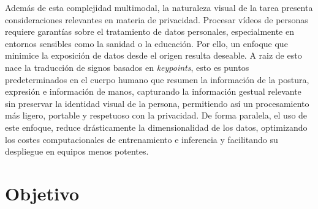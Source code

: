 Además de esta complejidad multimodal, la naturaleza visual de la tarea presenta consideraciones relevantes en materia de privacidad. Procesar vídeos de personas requiere garantías sobre el tratamiento de datos personales, especialmente en entornos sensibles como la sanidad o la educación. Por ello, un enfoque que minimice la exposición de datos desde el origen resulta deseable. A raiz de esto nace la traducción de signos basados en \textit{keypoints}, esto es puntos predeterminados en el cuerpo humano que resumen la información de la postura, expresión e información de manos, capturando la información gestual relevante sin preservar la identidad visual de la persona, permitiendo así un procesamiento más ligero, portable y respetuoso con la privacidad. De forma paralela, el uso de este enfoque, reduce drásticamente la dimensionalidad de los datos, optimizando los costes computacionales de entrenamiento e inferencia y facilitando su despliegue en equipos menos potentes.

\section{Objetivo}
